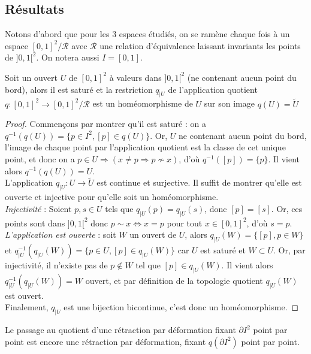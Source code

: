 \subsection{Résultats}
Notons d'abord que pour les $3$ espaces étudiés, on se ramène chaque fois à un espace $[0,1]^2/\mathcal{R}$ avec $\mathcal{R}$ une relation d'équivalence laissant invariants les points de $]0,1[^2$. On notera aussi $I=[0,1]$.
\begin{proposition}
    Soit un ouvert $U$ de $[0,1]^2$ à valeurs dans $]0,1[^2$ (ne contenant aucun point du bord), alors il est saturé et la restriction $q_{|U}$ de l'application quotient $q:[0,1]^2\rightarrow[0,1]^2/\mathcal{R}$ est un homéomorphisme de $U$ sur son image $q(U)=\tilde{U}$
\end{proposition}
\begin{proof}
    Commençons par montrer qu'il est saturé : on a $q^{-1}(q(U))=\{p\in I^2, [p]\in q(U)\}$. Or, $U$ ne contenant aucun point du bord, l'image de chaque point par l'application quotient est la classe de cet unique point, et donc on a $p\in U\Rightarrow(x\neq p\Rightarrow p\not\sim x)$, d'où $q^{-1}([p])=\{p\}$. Il vient alors $q^{-1}(q(U))=U$.\medskip\\
    L'application $q_{|U}:U\rightarrow\tilde{U}$ est continue et surjective. Il suffit de montrer qu'elle est ouverte et injective pour qu'elle soit un homéomorphisme.\medskip\\
    \textit{Injectivité} : Soient $p,s\in U$ tels que $q_{|U}(p)=q_{|U}(s)$, donc $[p]=[s]$. Or, ces points sont dans $]0,1[^2$ donc $p\sim x\iff x=p$ pour tout $x\in[0,1]^2$, d'où $s=p$.\medskip\\
    \textit{L'application est ouverte} : soit $W$ un ouvert de $U$, alors $q_{|U}(W)=\{[p],p\in W\}$ et $q_{|U}^{-1}(q_{|U}(W))=\{p\in U,[p]\in q_{|U}(W)\}$ car $U$ est saturé et $W\subset U$. Or, par injectivité, il n'existe pas de $p\not\in W$ tel que $[p]\in q_{|U}(W)$. Il vient alors $q_{|U}^{-1}(q_{|U}(W))=W$ ouvert, et par définition de la topologie quotient $q_{|U}(W)$ est ouvert.\medskip\\
    Finalement, $q_{|U}$ est une bijection bicontinue, c'est donc un homéomorphisme.
\end{proof}
\begin{proposition}
    Le passage au quotient d'une rétraction par déformation fixant $\partial I^2$ point par point est encore une rétraction par déformation, fixant $q(\partial I^2)$ point par point.
\end{proposition}
